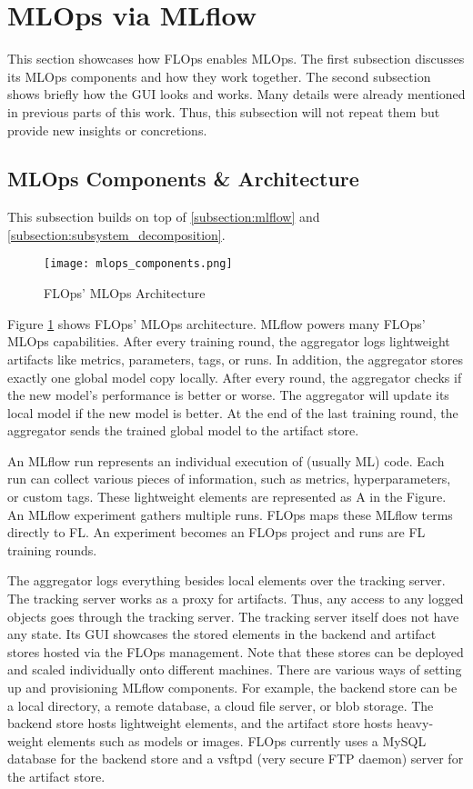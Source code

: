 \section{MLOps via MLflow}

This section showcases how FLOps enables MLOps.
The first subsection discusses its MLOps components and how they work together.
The second subsection shows briefly how the GUI looks and works.
Many details were already mentioned in previous parts of this work.
Thus, this subsection will not repeat them but provide new insights or concretions.

\subsection{MLOps Components \& Architecture}

This subsection builds on top of \ref{subsection:mlflow} and \ref{subsection:subsystem_decomposition}.
\begin{figure}[h]
    \centering
    \texttt{[image: mlops\_components.png]}
    \caption{FLOps' MLOps Architecture}
    \label{fig:mlops_architecture}
\end{figure}
Figure \ref{fig:mlops_architecture} shows FLOps' MLOps architecture.
MLflow powers many FLOps' MLOps capabilities.
After every training round, the aggregator logs lightweight artifacts like metrics, parameters, tags, or runs.
In addition, the aggregator stores exactly one global model copy locally.
After every round, the aggregator checks if the new model's performance is better or worse.
The aggregator will update its local model if the new model is better.
At the end of the last training round, the aggregator sends the trained global model to the artifact store.

An MLflow run represents an individual execution of (usually ML) code.
Each run can collect various pieces of information, such as metrics, hyperparameters, or custom tags.
These lightweight elements are represented as A in the Figure.
An MLflow experiment gathers multiple runs.
FLOps maps these MLflow terms directly to FL.
An experiment becomes an FLOps project and runs are FL training rounds.

The aggregator logs everything besides local elements over the tracking server. 
The tracking server works as a proxy for artifacts.
Thus, any access to any logged objects goes through the tracking server.
The tracking server itself does not have any state.
Its GUI showcases the stored elements in the backend and artifact stores hosted via the FLOps management.
Note that these stores can be deployed and scaled individually onto different machines.
There are various ways of setting up and provisioning MLflow components.
For example, the backend store can be a local directory, a remote database, a cloud file server, or blob storage.
The backend store hosts lightweight elements, and the artifact store hosts heavy-weight elements such as models or images.
FLOps currently uses a MySQL database for the backend store and a vsftpd (very secure FTP daemon) server for the artifact store.

